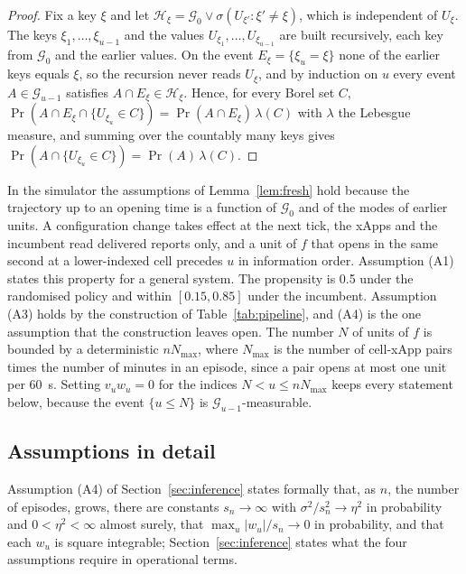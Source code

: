 \begin{proof}
Fix a key $\xi$ and let $\mathcal{H}_\xi = \mathcal{G}_0 \vee \sigma(U_{\xi'} : \xi' \ne \xi)$,
which is independent of $U_\xi$. The keys $\xi_1, \dots, \xi_{u-1}$ and the values
$U_{\xi_1}, \dots, U_{\xi_{u-1}}$ are built recursively, each key from $\mathcal{G}_0$ and the
earlier values. On the event $E_\xi = \{\xi_u = \xi\}$ none of the earlier keys equals
$\xi$, so the recursion never reads $U_\xi$, and by induction on $u$ every event
$A \in \mathcal{G}_{u-1}$ satisfies $A \cap E_\xi \in \mathcal{H}_\xi$. Hence, for every Borel
set $C$,
$\Pr(A \cap E_\xi \cap \{U_{\xi_u} \in C\}) = \Pr(A \cap E_\xi)\, \lambda(C)$ with
$\lambda$ the Lebesgue measure, and summing over the countably many keys gives
$\Pr(A \cap \{U_{\xi_u} \in C\}) = \Pr(A)\, \lambda(C)$.
\end{proof}

In the simulator the assumptions of Lemma~\ref{lem:fresh} hold because the trajectory up to an
opening time is a function of $\mathcal{G}_0$ and of the modes of earlier units. A configuration change takes effect at the next tick, the xApps and the incumbent read delivered reports only, and
a unit of $f$ that opens in the same second at a lower-indexed cell precedes $u$ in information
order. Assumption (A1) states this property for a general system. The propensity is 0.5 under the randomised
policy and within $[0.15, 0.85]$ under the incumbent.
Assumption (A3) holds by the construction of Table~\ref{tab:pipeline}, and (A4) is the one assumption that the
construction leaves open.
 The number $N$ of units of $f$ is
bounded by a deterministic $n N_{\max}$, where $N_{\max}$ is the number of cell-xApp pairs times the number of
minutes in an episode, since a pair opens at most one unit per 60~s. Setting $v_u w_u = 0$ for the indices
$N < u \le n N_{\max}$ keeps every statement below, because the event
$\{u \le N\}$ is $\mathcal{G}_{u-1}$-measurable.

\subsection{Assumptions in detail}
\label{app:assumptions}

Assumption (A4) of Section~\ref{sec:inference} states formally that, as $n$, the number of episodes, grows, there are constants $s_n \to \infty$ with $\sigma^2 / s_n^2 \to \eta^2$ in probability and
$0 < \eta^2 < \infty$ almost surely, that $\max_u |w_u| / s_n \to 0$ in probability, and that each $w_u$ is square
integrable; Section~\ref{sec:inference} states what the four assumptions require in operational terms.

